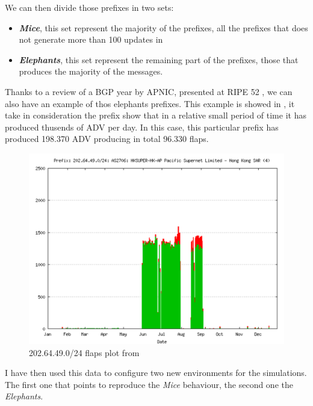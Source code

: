 We can then divide those prefixes in two sets:
\begin{itemize}
	\item \textbf{\textit{Mice}}, this set represent the majority of the prefixes,
		all the prefixes that does not generate more than \num{100} updates 
		in 
	\item \textbf{\textit{Elephants}}, this set represent the remaining part
		of the prefixes, those that produces the majority of the messages.
\end{itemize}

Thanks to a review of a \ac{BGP} year by APNIC, presented at RIPE 52 \cite{huston2006bgp}, we can also have an example of thos elephants prefixes.
This example is showed in , it take in consideration the
prefix  show that in a relative small period of time it has
produced thusends of \ac{ADV} per day.
In this case, this particular prefix has produced \num{198,370} \ac{ADV} producing
in total \num{96,330} flaps.

\begin{figure}[h]
    \centering
    \includegraphics[scale=0.22]{images/RFD/miceVSelephants/ripePrefixFlap.png}
	\caption{202.64.49.0/24 flaps plot from \cite{huston2006bgp}}
    \label{fig:ripePrefixFlaps}
\end{figure}

I have then used this data to configure two new environments for the simulations.
The first one that points to reproduce the \textit{Mice} behaviour, the second
one the \textit{Elephants}.

